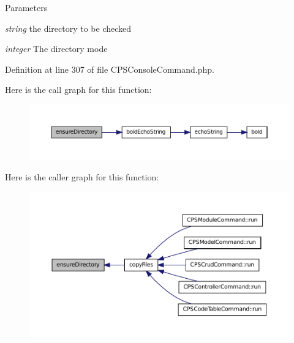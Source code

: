 \begin{DoxyParams}{Parameters}
\item[{\em string}]the directory to be checked \item[{\em integer}]The directory mode \end{DoxyParams}


Definition at line 307 of file CPSConsoleCommand.php.








Here is the call graph for this function:\nopagebreak
\begin{figure}[H]
\begin{center}
\leavevmode
\includegraphics[width=400pt]{classCPSConsoleCommand_abb9234be873ca733205fa23f41ce37b5_cgraph}
\end{center}
\end{figure}




Here is the caller graph for this function:\nopagebreak
\begin{figure}[H]
\begin{center}
\leavevmode
\includegraphics[width=400pt]{classCPSConsoleCommand_abb9234be873ca733205fa23f41ce37b5_icgraph}
\end{center}
\end{figure}


